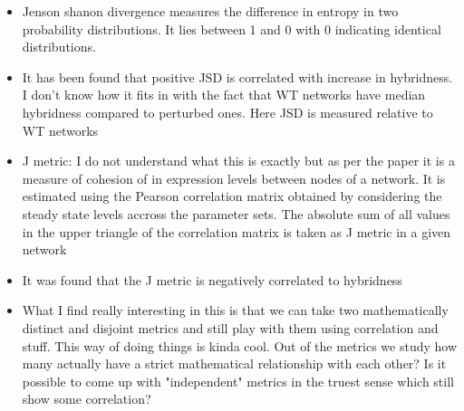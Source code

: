 \documentclass{article}
\begin{document}
\begin{itemize}
\item Jenson shanon divergence measures the difference in entropy in two probability distributions. It lies between 1 and 0 with 0 indicating identical distributions. 

\item It has been found that positive JSD is correlated with increase in hybridness. I don't know how it fits in with the fact that WT networks have median hybridness compared to perturbed ones. Here JSD is measured relative to WT networks 

\item J metric: I do not understand what this is exactly but as per the paper it is a measure of cohesion of in expression levels between nodes of a network. It is estimated using the Pearson correlation matrix obtained by considering the steady state levels accross the parameter sets. The absolute sum of all values in the upper triangle of the correlation matrix is taken as J metric in a given network 

\item It was found that the J metric is negatively correlated to hybridness 

\item What I find really interesting in this is that we can take two mathematically distinct and disjoint metrics and still play with them using correlation and stuff. This way of doing things is kinda cool. Out of the metrics we study how many actually have a strict mathematical relationship with each other? Is it possible to come up with "independent" metrics in the truest sense which still show some correlation? 









\end{itemize}
\end{document}
